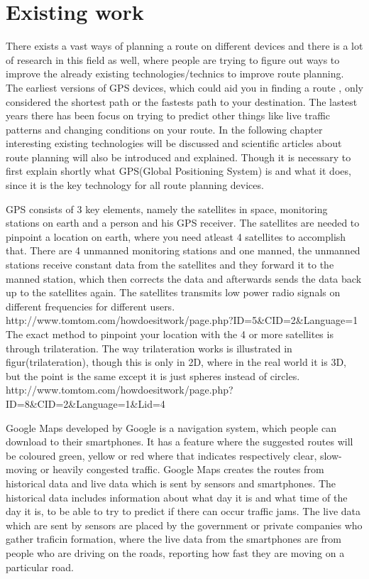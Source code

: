 \section{Existing work}
There exists a vast ways of planning a route on different devices and there is  a lot of research in this field as well, where people are trying to figure out ways to improve the already existing technologies/technics to improve route planning. The earliest versions of GPS devices, which could aid you in finding a route , only considered the shortest path or the fastests path to your destination. 
The lastest years there has been focus on trying to predict other things like live traffic patterns and changing conditions on your route.
In the following chapter interesting existing technologies will be discussed and scientific articles about route planning will also be introduced and explained. Though it is necessary to first explain shortly what GPS(Global Positioning System) is and what it does, since it is the key technology for all route planning devices.

GPS consists of 3 key elements, namely the satellites in space, monitoring stations on earth and a person and his GPS receiver. The satellites are needed to pinpoint a location on earth, where you need atleast 4 satellites to accomplish that. 
There are 4 unmanned monitoring stations and one manned, the unmanned stations receive constant data from the satellites and they forward it to the manned station, which then corrects the data and afterwards sends the data back up to the satellites  again. The satellites transmits low power radio signals on different frequencies for different users.
http://www.tomtom.com/howdoesitwork/page.php?ID=5\&CID=2\&Language=1
The exact method to pinpoint your location with the 4 or more satellites is through trilateration. The way trilateration works is illustrated in figur(trilateration), though this is only in 2D, where in the real world it is 3D, but the point is the same except it is just spheres instead of circles.
http://www.tomtom.com/howdoesitwork/page.php?ID=8\&CID=2\&Language=1\&Lid=4



Google Maps developed by Google is a navigation system, which people can download to their smartphones. It has a feature where the suggested routes will be coloured green, yellow or red where that indicates respectively clear, slow-moving or heavily congested traffic. 
Google Maps creates the routes from historical data and live data which is sent by sensors and smartphones. The historical data includes information about what day it is and what time of the day it is, to be able to try to predict if there can occur traffic jams. The live data which are sent by sensors are placed by the government or private companies who gather traficin formation, where the live data from the smartphones are from people who are driving on the roads, reporting how fast they are moving on a particular road.

